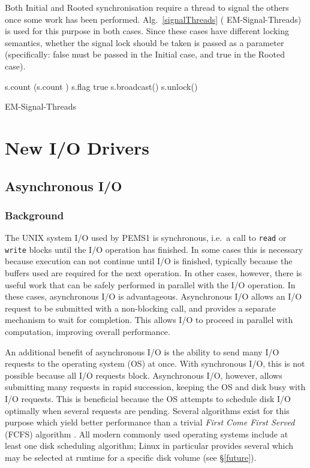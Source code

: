 \documentclass[12pt]{carletoncsthesis}
\begin{document}
Both Initial and Rooted synchronisation require a thread to signal the others
once some work has been performed.  Alg.~\ref{signalThreads} ({\sc
EM-Signal-Threads}) is used for this purpose in both cases.  Since these
cases have different locking semantics, whether the signal lock should be
taken is passed as a parameter (specifically: false must be passed in the
Initial case, and true in the Rooted case).

\begin{algorithm}[h]
	\BlankLine
	s.count  (s.count )\;
	s.flag  true \;
	s.broadcast() \;
	s.unlock()\;
	\caption{\sc EM-Signal-Threads}
	\label{signalThreads}
\end{algorithm}



\chapter{New I/O Drivers}
\thispagestyle{empty}
\label{io-drivers}


\section{Asynchronous I/O}
\label{async}


\subsection{Background}


The UNIX system I/O used by PEMS1 is synchronous, i.e.\ a call to {\tt read}
or {\tt write} blocks until the I/O operation has finished.  In some cases
this is necessary because execution can not continue until I/O is finished,
typically because the buffers used are required for the next operation.
In other cases, however, there is useful work that can be safely performed
in parallel with the I/O operation.  In these cases, asynchronous I/O is
advantageous.  Asynchronous I/O allows an I/O request to be submitted with a
non-blocking call, and provides a separate mechanism to wait for completion.
This allows I/O to proceed in parallel with computation, improving overall
performance.

An additional benefit of asynchronous I/O is the ability to send many
I/O requests to the operating system (OS) at once.  With synchronous I/O,
this is not possible because all I/O requests block.  Asynchronous I/O,
however, allows submitting many requests in rapid succession, keeping the
OS and disk busy with I/O requests.  This is beneficial because the OS
attempts to schedule disk I/O optimally when several requests are pending.
Several algorithms exist for this purpose which yield better performance than
a trivial {\em First Come First Served} (FCFS) algorithm \cite{disksched}.
All modern commonly used operating systems include at least one disk
scheduling algorithm; Linux in particular provides several which may be
selected at runtime for a specific disk volume (see \S\ref{future}).
\end{document}
